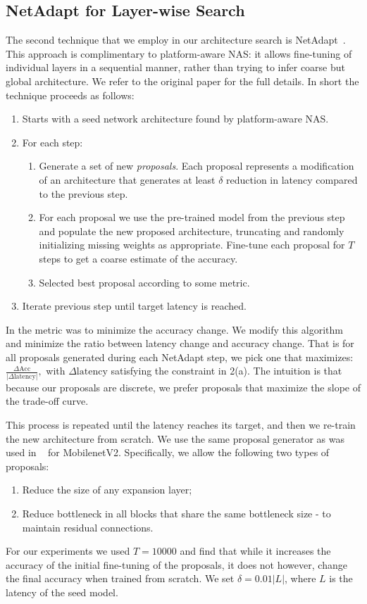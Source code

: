 \documentclass[10pt,twocolumn,letterpaper]{article}
\begin{document}
\subsection{NetAdapt for Layer-wise Search}
%
The second technique that we employ in our architecture search is NetAdapt~\cite{NetAdapt}. This 
approach is complimentary to platform-aware NAS: it allows fine-tuning of individual layers in a sequential manner,
rather than trying to infer coarse but global architecture. We refer to the original paper for the full details.
In short the technique proceeds as follows:
\begin{enumerate}[itemsep=0mm]
\item Starts with a seed network architecture found by platform-aware NAS. 
\item For each step: 
\begin{enumerate}[itemsep=0mm]
\item Generate a set of  new {\it proposals}. Each proposal
represents a modification of an architecture that generates at least $\delta$ reduction in latency compared to the previous step.
\item For each proposal we use the pre-trained model from the  previous step and populate the new proposed architecture, truncating and randomly initializing missing
weights as appropriate. Fine-tune each proposal for $T$ steps to get a coarse estimate of the accuracy.
\item  Selected best proposal according to some metric. 
\end{enumerate}
\item Iterate previous step until target latency is reached.
\end{enumerate}
 In \cite{NetAdapt} the metric was to minimize the accuracy change. 
We modify this algorithm and minimize the ratio between latency change and accuracy change. That is for all proposals generated during each NetAdapt step, we pick one that maximizes:  $\frac{\Delta\text{Acc}}{|\Delta\text{latency}|},$  with $\Delta\text{latency}$ satisfying the constraint in 2(a). The intuition is that because our proposals are discrete, we prefer proposals that maximize the slope of the trade-off curve.

This process is repeated until the latency reaches its target,  and then we re-train the new architecture from scratch.
We use the same proposal generator as was used in ~\cite{NetAdapt} for MobilenetV2. Specifically, we allow the following two  types of proposals: 
\begin{enumerate}
    \item Reduce the size of any expansion layer;
    \item Reduce bottleneck in all blocks that share the same bottleneck size - to maintain residual connections.
\end{enumerate}
For our experiments we used $T=10000$ and find that while it increases the accuracy of the initial fine-tuning of the proposals, it does not however, change the final accuracy when trained from scratch. We set $\delta=0.01 | L |$, where $L$ is the latency of the seed model. 
%
%
\end{document}
